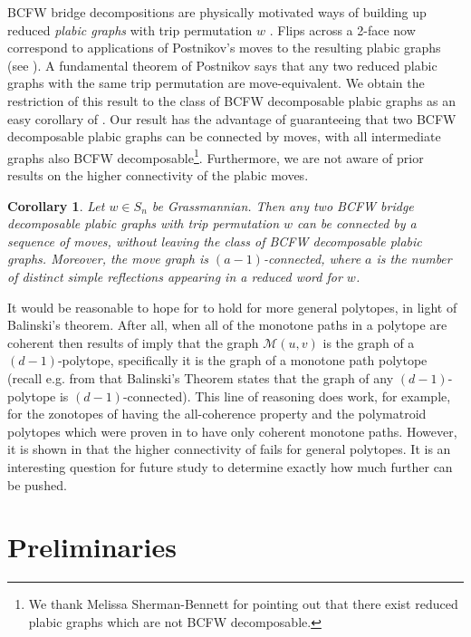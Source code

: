 \documentclass[12pt]{amsart}
\theoremstyle{plain}
\newtheorem{cor}[thm]{Corollary}
\theoremstyle{definition}
\theoremstyle{remark}
\begin{document}
BCFW bridge decompositions are physically motivated ways of building up reduced \emph{plabic graphs} with trip permutation $w$ \cite{arkani-hamed-book}. Flips across a 2-face now correspond to applications of Postnikov's moves \cite{postnikov} to the resulting plabic graphs (see \cite[Thm.~5.3]{wi}). A fundamental theorem of Postnikov \cite{postnikov} says that any two reduced plabic graphs with the same trip permutation are move-equivalent. We obtain the restriction of this result to the class of BCFW decomposable plabic graphs as an easy corollary of . Our result has the advantage of guaranteeing that two BCFW decomposable plabic graphs can be connected by moves, with all intermediate graphs also BCFW decomposable\footnote{We thank Melissa Sherman-Bennett for pointing out that there exist reduced plabic graphs which are not BCFW decomposable.}. Furthermore, we are not aware of prior results on the higher connectivity of the plabic moves.

\begin{cor}
\label{cor:BCFW}
Let $w \in S_n$ be Grassmannian. Then any two BCFW bridge decomposable plabic graphs with trip permutation $w$ can be connected by a sequence of moves, without leaving the class of BCFW decomposable plabic graphs. Moreover, the move graph is $(a-1)$-connected, where $a$ is the number of distinct simple reflections appearing in a reduced word for $w$.
\end{cor}

It would be reasonable to hope for  to hold  for more general polytopes, in light of Balinski's theorem. After all, when all of the  monotone paths in a polytope are coherent  then results of \cite{BKS} imply that  the graph $\mathcal{M}(u,v)$  is  the graph of a $(d-1)$-polytope, specifically it is   the graph of a monotone path polytope (recall e.g. from \cite{Zi}  that Balinski's Theorem states that the graph of any $(d-1)$-polytope is $(d-1)$-connected). This line of reasoning does work, for example, for the  zonotopes of \cite{EJLM} having the all-coherence property and the polymatroid polytopes which were proven in  \cite{BS} to have only coherent monotone paths. However, it is shown in \cite{AER} that the higher connectivity of  fails for general polytopes.  It is an interesting question for future study to determine exactly how much further  can be pushed.  

\section{Preliminaries}\label{sec:prelim}
\end{document}
